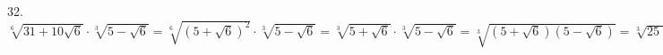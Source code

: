32. $\sqrt[6]{31+10\sqrt{6}}\cdot\sqrt[3]{5-\sqrt{6}}=\sqrt[6]{(5+\sqrt{6})^2}\cdot\sqrt[3]{5-\sqrt{6}}=\sqrt[3]{5+\sqrt{6}}\cdot\sqrt[3]{5-\sqrt{6}}=
\sqrt[3]{(5+\sqrt{6})(5-\sqrt{6})}=\sqrt[3]{25-6}=\sqrt[3]{19}.$\\
